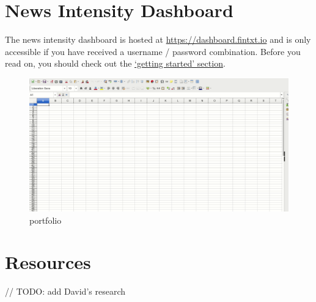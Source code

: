 \documentclass[]{book}
\theoremstyle{definition}
\theoremstyle{definition}
\theoremstyle{definition}
\theoremstyle{remark}
\begin{document}
\chapter{News Intensity Dashboard}\label{thedashboard}

The news intensity dashboard is hosted at
\href{https://dashboard.fintxt.io/app/FinTxtDashboard}{https://dashboard.fintxt.io}
and is only accessible if you have received a username / password
combination. Before you read on, you should check out the
\href{https://fintxt.github.io/documentation/gettinstarted.html}{`getting
started' section}.

\begin{figure}
\centering
\includegraphics{img/createportfolio.gif}
\caption{portfolio}
\end{figure}

\chapter{Resources}\label{resources}

// TODO: add David's research


\end{document}
